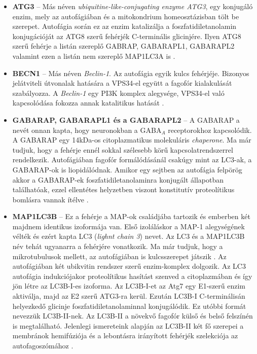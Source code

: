 \documentclass[a4paper,12pt]{article}
\begin{document}
				\begin{itemize}
					\item \textbf{ATG3} -- Más néven \textit{ubiquitine-like-conjugating enzyme ATG3}, egy konjugáló enzim, mely az autofágiában és a mitokondrium homeosztázisban tölt be szerepet. Autofágia során ez az enzim katalizálja a foszfatidiletanolamin konjugációját az ATG8 szerű fehérjék C-terminális glicinjére. Ilyen ATG8 szerű fehérje a listán szereplő GABRAP, GABARAPL1, GABARAPL2 valamint ezen a listán nem szereplő MAP1LC3A is \cite{autophagy_proteins}. 

					\item \textbf{BECN1} -- Más néven \textit{Beclin-1}. Az autofágia egyik kulcs fehérjéje. Bizonyos jelátviteli útvonalak hatására a VPS34-el együtt a fagofór kialakulását szabályozza. A \textit{Beclin-1} egy PI3K komplex alegysége, VPS34-el való kapcsolódása fokozza annak katalitikus hatását \cite{autophagy_proteins}. 
					
					\item \textbf{GABARAP, GABARAPL1 és a GABARAPL2} -- A GABARAP a nevét onnan kapta, hogy neuronokban a GABA$_A$ receptorokhoz kapcsolódik. A GABARAP egy 14kDa-os citoplazmatikus molekuláris \textit{chaperone}. Ma már tudjuk, hogy a fehérje ennél sokkal szélesebb körű kapcsolatrendszerrel rendelkezik. Autofágiában fagofór formálódásánál csakúgy mint az LC3-ak, a GABARAP-ok is liopidálódnak. Amikor egy sejtben az autofágia felpörög akkor a GABARAP-ek foszfatidiletanolaminra konjugált állapotban találhatóak, ezzel ellentétes helyzetben viszont konstitutív proteolítikus bomlásra vannak ítélve \cite{atg8_like}. 

					\item \textbf{MAP1LC3B} -- Ez a fehérje a MAP-ok családjába tartozik és emberben két majdnem identikus izoformája van. Első izoláláskor a MAP-1 alegységének vélték és ezért kapta LC3 (\textit{lighnt chain 3}) nevet. Az LC3 és a MAP1LC3B név tehát ugyanarra a fehérjére vonatkozik. Ma már tudjuk, hogy a mikrotubulusok mellett, az autofágiában is kulcsszerepet játszik \cite{atg8_like}.  Az autofágiában két ubikvitin rendszer szerű enzim-komplex dolgozik. Az LC3 autofágia indukciójakor proteolítikus hasítást szenved a citoplazmában és így jön létre az LC3B-I-es izoforma. Az LC3B-I-et az Atg7 egy E1-szerű enzim aktiválja, majd az E2 szerű ATG3-ra kerül. Ezután LC3B-I C-terminálisán helyezkedő glicinje foszfatidiletanolaminnal konjugálódik. Ez utóbbi formát nevezzük LC3B-II-nek. Az LC3B-II a növekvő fagofór külső és belső felszínén is megtalálható. Jelenlegi ismereteink alapján az LC3B-II két fő szerepei a membránok hemifúziója és a lebontásra irányított fehérjék szelekciója az autofagoszómához \cite{autophagy_proteins}. 
					

\end{itemize}
\end{document}
